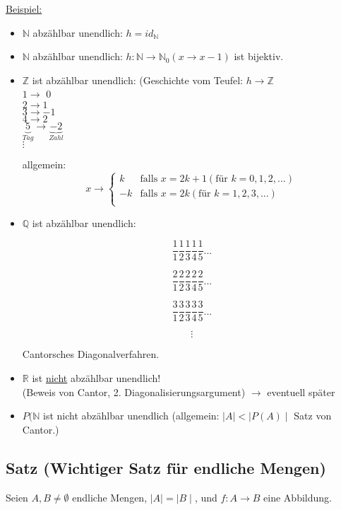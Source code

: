 \documentclass[a4paper, 12pt, twoside] {article}
\begin{document}
\underline{Beispiel:}
\begin{itemize}
\item $\mathbb{N}$  abzählbar unendlich: $h = id_{\mathbb{N}}$
\item $\mathbb{N}$ abzählbar unendlich: $h \colon \mathbb{N} \rightarrow \mathbb{N}_{0} (x \rightarrow x-1)$ ist bijektiv.
\item $\mathbb{Z}$ ist abzählbar unendlich: (Geschichte vom Teufel:  $h \rightarrow \mathbb{Z}$ \\
$1 \rightarrow$ 0 \\
$2 \rightarrow 1$ \\
$3 \rightarrow -1$ \\
$4 \rightarrow 2$ \\
$\underbrace{5}_{Tag} \rightarrow \underbrace{-2}_{Zahl}$ \\
$\vdots$

allgemein: \\
\[ x \rightarrow
  \begin{cases}
    k & \text{falls } x = 2k+1 (\text{für } k = 0, 1, 2, ...)\\
    -k  & \text{falls } x = 2k (\text{für } k = 1, 2, 3, ...)\\
  \end{cases}
\]

\item $\mathbb{Q}$ ist abzählbar unendlich:

$$\frac{1}{1} \frac{1}{2} \frac{1}{3} \frac{1}{4} \frac{1}{5} ...$$

$$\frac{2}{1} \frac{2}{2} \frac{2}{3} \frac{2}{4} \frac{2}{5} ...$$

$$\frac{3}{1} \frac{3}{2} \frac{3}{3} \frac{3}{4} \frac{3}{5} ...$$

$$\vdots$$

Cantorsches Diagonalverfahren.

\item $\mathbb{R}$ ist \underline{nicht} abzählbar unendlich! \\
(Beweis von Cantor, 2. Diagonalisierungsargument)
$\rightarrow$ eventuell später

\item $P(\mathbb{N}$ ist nicht abzählbar unendlich (allgemein: $\mid A \mid < \mid P(A) \mid$ Satz von Cantor.)

\end{itemize}

\subsection{Satz (Wichtiger Satz für endliche Mengen)}
Seien $A, B \neq \emptyset$ endliche Mengen, $\mid A \mid = \mid B \mid$, und $f \colon A \rightarrow B$ eine Abbildung.
\end{document}

